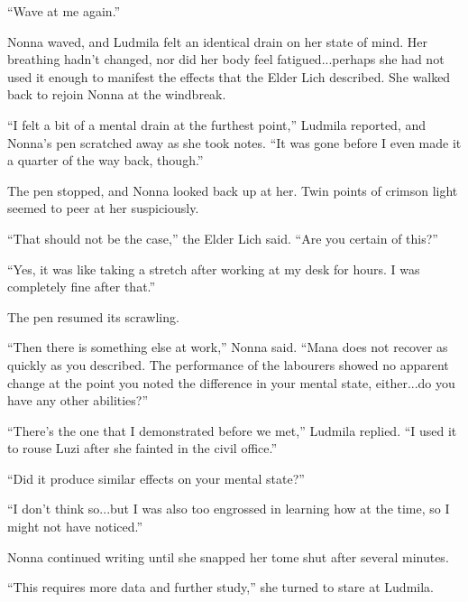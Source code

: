 

“Wave at me again.”

 

Nonna waved, and Ludmila felt an identical drain on her state of mind. Her breathing hadn’t changed, nor did her body feel fatigued...perhaps she had not used it enough to manifest the effects that the Elder Lich described. She walked back to rejoin Nonna at the windbreak.

 

“I felt a bit of a mental drain at the furthest point,” Ludmila reported, and Nonna’s pen scratched away as she took notes. “It was gone before I even made it a quarter of the way back, though.”

 

The pen stopped, and Nonna looked back up at her. Twin points of crimson light seemed to peer at her suspiciously.

 

“That should not be the case,” the Elder Lich said. “Are you certain of this?”

 

“Yes, it was like taking a stretch after working at my desk for hours. I was completely fine after that.”

 

The pen resumed its scrawling.

 

“Then there is something else at work,” Nonna said. “Mana does not recover as quickly as you described. The performance of the labourers showed no apparent change at the point you noted the difference in your mental state, either...do you have any other abilities?”

 

“There’s the one that I demonstrated before we met,” Ludmila replied. “I used it to rouse Luzi after she fainted in the civil office.”

 

“Did it produce similar effects on your mental state?”

 

“I don’t think so...but I was also too engrossed in learning how at the time, so I might not have noticed.”

 

Nonna continued writing until she snapped her tome shut after several minutes.

 

“This requires more data and further study,” she turned to stare at Ludmila.

